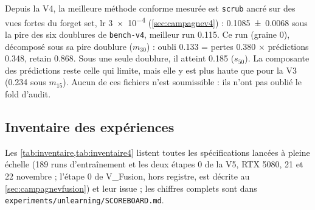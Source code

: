 \documentclass[11pt,a4paper]{article}
\newcommand{\code}[1]{\texttt{#1}}
\newcommand{\chemin}[1]{\nolinkurl{#1}}%
\begin{document}
Depuis la V4, la meilleure méthode conforme mesurée est \code{scrub} ancré sur des vues fortes du
forget set, lr \num{3e-4} (\cref{sec:campagnev4}) : \num{0.1085 +- 0.0068} sous la pire des six
doublures de \code{bench-v4}, meilleur run \num{0.115}. Ce run (graine 0), décomposé sous sa pire
doublure ($m_{30}$) : oubli \num{0.133} = pertes \num{0.380} $\times$ prédictions \num{0.348}, retain
\num{0.868}. Sous une seule doublure, il atteint \num{0.185} ($s_{50}$). La composante des prédictions
reste celle qui limite, mais elle y est plus haute que pour la V3 (\num{0.234} sous $m_{15}$). Aucun de
ces fichiers n'est soumissible : ils n'ont pas oublié le fold d'audit.

\subsection{Inventaire des expériences}\label{sec:inventaire}
Les \cref{tab:inventaire,tab:inventaire4} listent toutes les spécifications lancées à pleine échelle
(189 runs d'entraînement et les deux étapes 0 de la V5, RTX 5080, 21 et 22 novembre ; l'étape 0 de
V\_Fusion, hors registre, est décrite au \cref{sec:campagnevfusion}) et leur issue ; les chiffres complets sont dans
\chemin{experiments/unlearning/SCOREBOARD.md}.
\end{document}
